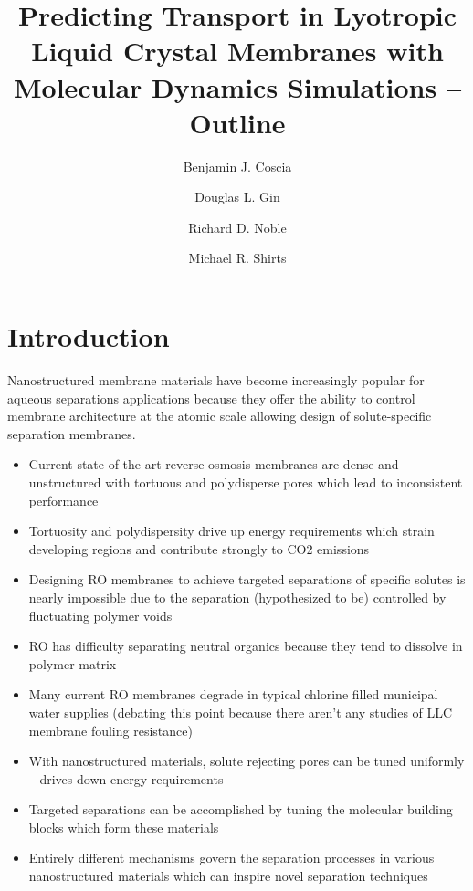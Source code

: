 \documentclass{article}
\title{Predicting Transport in Lyotropic Liquid Crystal Membranes with Molecular Dynamics Simulations -- Outline}
\author{Benjamin J. Coscia \and Douglas L. Gin \and Richard D. Noble \and Michael R. Shirts}
\begin{document}
	
	\graphicspath{{./figures/}}
	\maketitle
	\section{Introduction}
	Nanostructured membrane materials have become increasingly popular for aqueous separations applications because they offer the ability to control membrane architecture at the atomic scale allowing design of solute-specific separation membranes.
	\begin{itemize}
		\item Current state-of-the-art reverse osmosis membranes are dense and unstructured with tortuous and polydisperse pores which lead to inconsistent performance
		\item Tortuosity and polydispersity drive up energy requirements which strain developing regions and contribute strongly to CO2 emissions
		\item Designing RO membranes to achieve targeted separations of specific solutes is nearly impossible due to the separation (hypothesized to be) controlled by fluctuating polymer voids
		\item RO has difficulty separating neutral organics because they tend to dissolve in polymer matrix
		\item Many current RO membranes degrade in typical chlorine filled municipal water supplies (debating this point because there aren't any studies of LLC membrane fouling resistance)  
		\item With nanostructured materials, solute rejecting pores can be tuned uniformly -- drives down energy requirements
		\item Targeted separations can be accomplished by tuning the molecular building blocks which form these materials
		\item Entirely different mechanisms govern the separation processes in various nanostructured materials which can inspire novel separation techniques
	\end{itemize}
	
\end{document}

